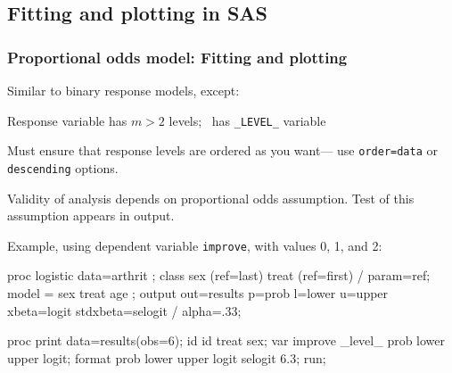 

\subsection{Fitting and plotting in SAS}
\begin{frame}[fragile]
  \frametitle{Proportional odds model: Fitting and plotting}
Similar to binary response models, except:
  \begin{itemize*}
	\item Response variable has $m>2$ levels;  \ODS\ has \verb|_LEVEL_| variable
	\item Must ensure that response levels are ordered as you want---
	use \texttt{order=data} or \texttt{descending} options.
	\item Validity of analysis depends on proportional odds assumption.
	Test of this assumption appears in  output.
  \end{itemize*}
Example, using dependent variable \texttt{improve}, with values 0, 1, and 2:
\vspace{1ex}
\begin{Input}[fontsize=\small,label=\fbox{\texttt{glogist2a.sas} $\cdots$},baselinestretch=0.8]
proc logistic data=arthrit ;
   class sex (ref=last) treat (ref=first) / param=ref;
   model   = sex  treat  age ;
   output out=results p=prob l=lower u=upper
          xbeta=logit stdxbeta=selogit / alpha=.33;

proc print data=results(obs=6);
   id id treat sex;
   var improve _level_ prob lower upper logit;
   format prob lower upper logit selogit 6.3;
run;
\end{Input}
\end{frame}

